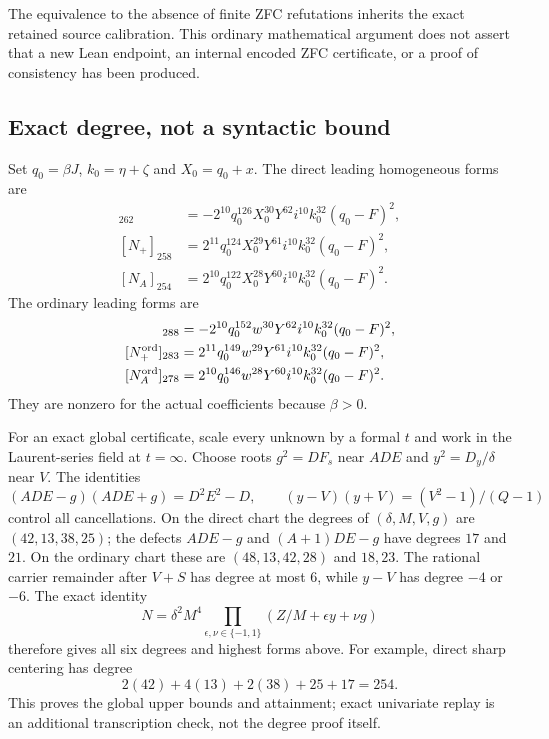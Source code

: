 The equivalence to the absence of finite ZFC refutations inherits the exact retained source calibration. This ordinary mathematical argument does not assert that a new Lean endpoint, an internal encoded ZFC certificate, or a proof of consistency has been produced.

\subsection{Exact degree, not a syntactic bound}
Set $q_0=\beta J$, $k_0=\eta+\zeta$ and $X_0=q_0+x$. The direct leading homogeneous forms are
\begin{align*}
[N_0]_{262}&=-2^{10}q_0^{126}X_0^{30}Y^{62}i^{10}k_0^{32}(q_0-F)^2,\\
[N_+]_{258}&=2^{11}q_0^{124}X_0^{29}Y^{61}i^{10}k_0^{32}(q_0-F)^2,\\
[N_A]_{254}&=2^{10}q_0^{122}X_0^{28}Y^{60}i^{10}k_0^{32}(q_0-F)^2.
\end{align*}
The ordinary leading forms are
\begin{align*}
[N^{\rm ord}_0]_{288}&=-2^{10}q_0^{152}w^{30}Y^{62}i^{10}k_0^{32}(q_0-F)^2,\\
[N^{\rm ord}_+]_{283}&=2^{11}q_0^{149}w^{29}Y^{61}i^{10}k_0^{32}(q_0-F)^2,\\
[N^{\rm ord}_A]_{278}&=2^{10}q_0^{146}w^{28}Y^{60}i^{10}k_0^{32}(q_0-F)^2.
\end{align*}
They are nonzero for the actual coefficients because $\beta>0$.

For an exact global certificate, scale every unknown by a formal $t$ and work in the Laurent-series field at $t=\infty$. Choose roots $g^2=DF_s$ near $ADE$ and $y^2=D_y/\delta$ near $V$. The identities
\[
 (ADE-g)(ADE+g)=D^2E^2-D,\qquad
 (y-V)(y+V)=(V^2-1)/(Q-1)
\]
control all cancellations. On the direct chart the degrees of $(\delta,M,V,g)$ are $(42,13,38,25)$; the defects $ADE-g$ and $(A+1)DE-g$ have degrees $17$ and $21$. On the ordinary chart these are $(48,13,42,28)$ and $18,23$. The rational carrier remainder after $V+S$ has degree at most $6$, while $y-V$ has degree $-4$ or $-6$. The exact identity
\[
 N=\delta^2M^4\prod_{\epsilon,\nu\in\{-1,1\}}
       (Z/M+\epsilon y+\nu g)
\]
therefore gives all six degrees and highest forms above. For example, direct sharp centering has degree
\[
 2(42)+4(13)+2(38)+25+17=254.
\]
This proves the global upper bounds and attainment; exact univariate replay is an additional transcription check, not the degree proof itself.


